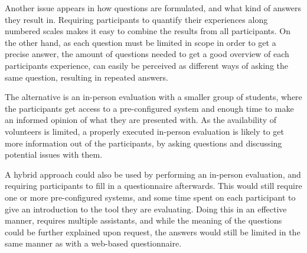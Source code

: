Another issue appears in how questions are formulated, and what kind of answers they result in.
Requiring participants to quantify their experiences along numbered scales makes it easy to combine the results from all participants.
On the other hand, as each question must be limited in scope in order to get a precise answer, the amount of questions needed to get a good overview of each participants experience, can easily be perceived as different ways of asking the same question, resulting in repeated answers.

The alternative is an in-person evaluation with a smaller group of students, where the participants get access to a pre-configured system and enough time to make an informed opinion of what they are presented with.
As the availability of volunteers is limited, a properly executed in-person evaluation is likely to get more information out of the participants, by asking questions and discussing potential issues with them.

A hybrid approach could also be used by performing an in-person evaluation, and requiring participants to fill in a questionnaire afterwards.
This would still require one or more pre-configured systems, and some time spent on each participant to give an introduction to the tool they are evaluating.
Doing this in an effective manner, requires multiple assistants, and while the meaning of the questions could be further explained upon request, the answers would still be limited in the same manner as with a web-based questionnaire.


